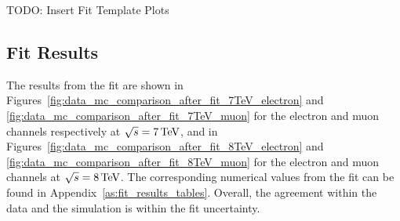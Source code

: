 TODO: Insert Fit Template Plots

\subsection{Fit Results}
\label{ss:fit_results}
The results from the fit are shown in Figures~\ref{fig:data_mc_comparison_after_fit_7TeV_electron} and
\ref{fig:data_mc_comparison_after_fit_7TeV_muon} for the electron and muon channels respectively at
$\sqrt{s}=7\,\text{Te\hspace{-.08em}V}$, and in Figures~\ref{fig:data_mc_comparison_after_fit_8TeV_electron} and
\ref{fig:data_mc_comparison_after_fit_8TeV_muon} for the electron and muon channels at $\sqrt{s}=8\,\text{Te\hspace{-.08em}V}$. The
corresponding numerical values from the fit can be found in Appendix~\ref{as:fit_results_tables}. Overall, the
agreement within the data and the simulation is within the fit uncertainty. 

